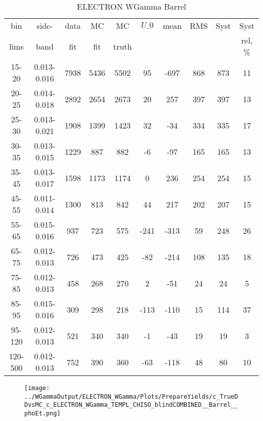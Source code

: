\documentclass{beamer}
\begin{document}
\begin{frame}
{
\begin{table}[h]
  		\tiny
  \begin{center}
  \caption{ELECTRON WGamma Barrel}
  \begin{tabular}{|c|c|c|c|c|c|c|c|c|c|}
    bin & side- & data & MC & MC    & $U\_{0}$ & mean & RMS & Syst & Syst \\ 
    lims & band & fit & fit & truth &       &      &     &      & rel, \% \\ \hline
    15-20 & 0.013-0.016 & 7938 & 5436 & 5502 & 95 & -697 & 868 & 873 & 11  \\ \hline
    20-25 & 0.014-0.018 & 2892 & 2654 & 2673 & 20 & 257 & 397 & 397 & 13  \\ \hline
    25-30 & 0.013-0.021 & 1908 & 1399 & 1423 & 32 & -34 & 334 & 335 & 17  \\ \hline
    30-35 & 0.013-0.015 & 1229 & 887 & 882 & -6 & -97 & 165 & 165 & 13  \\ \hline
    35-45 & 0.013-0.017 & 1598 & 1173 & 1174 & 0 & 236 & 254 & 254 & 15  \\ \hline
    45-55 & 0.011-0.014 & 1300 & 813 & 842 & 44 & 217 & 202 & 207 & 15  \\ \hline
    55-65 & 0.015-0.016 & 937 & 723 & 575 & -241 & -313 & 59 & 248 & 26  \\ \hline
    65-75 & 0.012-0.013 & 726 & 473 & 425 & -82 & -214 & 108 & 135 & 18  \\ \hline
    75-85 & 0.012-0.013 & 458 & 268 & 270 & 2 & -51 & 24 & 24 & 5  \\ \hline
    85-95 & 0.015-0.016 & 309 & 298 & 218 & -113 & -110 & 15 & 114 & 37  \\ \hline
    95-120 & 0.012-0.013 & 521 & 340 & 340 & -1 & -43 & 19 & 19 & 3  \\ \hline
    120-500 & 0.012-0.013 & 752 & 390 & 360 & -63 & -118 & 48 & 80 & 10  \\ \hline
  \end{tabular}
  \label{tab:systSbVar_Meth1_ELECTRON_WGamma_Barrel}
  \end{center}
\end{table}

\begin{figure}
\texttt{[image: ../WGammaOutput/ELECTRON\_WGamma/Plots/PrepareYields/c\_TrueDDvsMC\_c\_ELECTRON\_WGamma\_TEMPL\_CHISO\_blindCOMBINED\_\_Barrel\_\_phoEt.png]}
\end{figure}

}
\end{frame}
\end{document}
